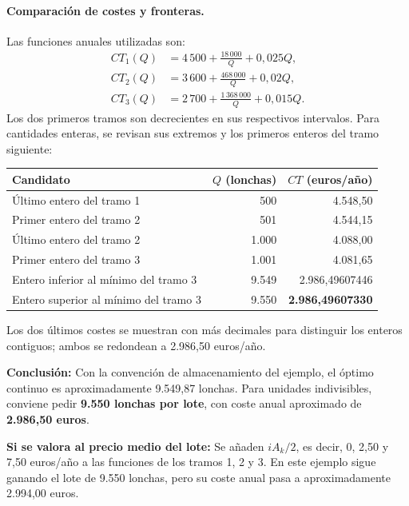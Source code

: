 \documentclass[11pt,a4paper]{article}
\begin{document}
\paragraph{Comparación de costes y fronteras.}
Las funciones anuales utilizadas son:
\begin{align*}
    CT_1(Q) & =4\,500+\frac{18\,000}{Q}+0{,}025Q,     \\
    CT_2(Q) & =3\,600+\frac{468\,000}{Q}+0{,}02Q,     \\
    CT_3(Q) & =2\,700+\frac{1\,368\,000}{Q}+0{,}015Q.
\end{align*}
Los dos primeros tramos son decrecientes en sus respectivos intervalos. Para cantidades enteras, se revisan sus extremos y los primeros enteros del tramo siguiente:
\begin{center}
    \renewcommand{\arraystretch}{1.2}
    \begin{tabular}{@{}lrr@{}}
        \toprule
        Candidato                             & $Q$ (lonchas) & $CT$ (euros/año)        \\
        \midrule
        Último entero del tramo 1             & 500           & 4.548,50                \\
        Primer entero del tramo 2             & 501           & 4.544,15                \\
        Último entero del tramo 2             & 1.000         & 4.088,00                \\
        Primer entero del tramo 3             & 1.001         & 4.081,65                \\
        Entero inferior al mínimo del tramo 3 & 9.549         & 2.986,49607446          \\
        Entero superior al mínimo del tramo 3 & 9.550         & \textbf{2.986,49607330} \\
        \bottomrule
    \end{tabular}
\end{center}
Los dos últimos costes se muestran con más decimales para distinguir los enteros contiguos; ambos se redondean a 2.986,50 euros/año.

\textbf{Conclusión:} Con la convención de almacenamiento del ejemplo, el óptimo continuo es aproximadamente 9.549,87 lonchas. Para unidades indivisibles, conviene pedir \textbf{9.550 lonchas por lote}, con coste anual aproximado de \textbf{2.986,50 euros}.

\textbf{Si se valora al precio medio del lote:} Se añaden $iA_k/2$, es decir, 0, 2,50 y 7,50 euros/año a las funciones de los tramos 1, 2 y 3. En este ejemplo sigue ganando el lote de 9.550 lonchas, pero su coste anual pasa a aproximadamente 2.994,00 euros.
\end{document}
